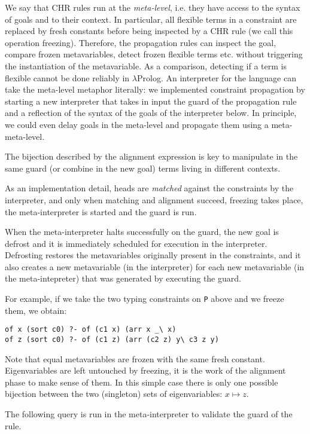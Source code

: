 \documentclass{easychair}
\begin{document}
We say that CHR rules run at the \emph{meta-level}, i.e. they have access
to the syntax of goals and to their context.  In particular, all flexible
terms in a constraint are replaced by fresh constants before being inspected
by a CHR rule (we call this operation freezing). Therefore, the propagation
rules can inspect the goal, compare frozen metavariables, detect frozen flexible terms etc. without triggering the instantiation of the metavariable. As a comparison, detecting if a term is flexible cannot be done reliably in $\lambda$Prolog. An interpreter for the language can take the meta-level metaphor literally: we implemented constraint propagation by starting a new interpreter that takes in input the guard of the propagation rule and a reflection of the syntax of the goals of the interpreter below. In principle, we could even delay goals in the meta-level and propagate them using a meta-meta-level.

The bijection described by the alignment expression is key to
manipulate in the same guard (or combine in the new goal) terms
living in different contexts.

As an implementation detail, heads are \emph{matched} against the
constraints by the interpreter, and only when matching and alignment succeed,
freezing takes place, the meta-interpreter is started and the guard is run.

When the meta-interpreter halts successfully on the guard, the new goal is
defrost and it is immediately scheduled for execution in the interpreter.
Defrosting restores the metavariables originally present in the constraints, and it also creates a new metavariable (in the interpreter) for each new metavariable (in the meta-intepreter) that was generated by executing the guard.

For example, if we take the two typing constraints on \verb+P+ above
and we freeze them, we obtain:

\begin{Verbatim}
of x (sort c0) ?- of (c1 x) (arr x _\ x)
of z (sort c0) ?- of (c1 z) (arr (c2 z) y\ c3 z y)
\end{Verbatim}

Note that equal metavariables are frozen with the same fresh
constant.  Eigenvariables are left untouched by freezing, it is
the work of the alignment phase to make sense of them.
In this simple case there is only one possible bijection
between the two (singleton) sets of eigenvariables: 
$x \mapsto z$.

The following query is run in the meta-interpreter to validate the guard of the rule.
\end{document}
